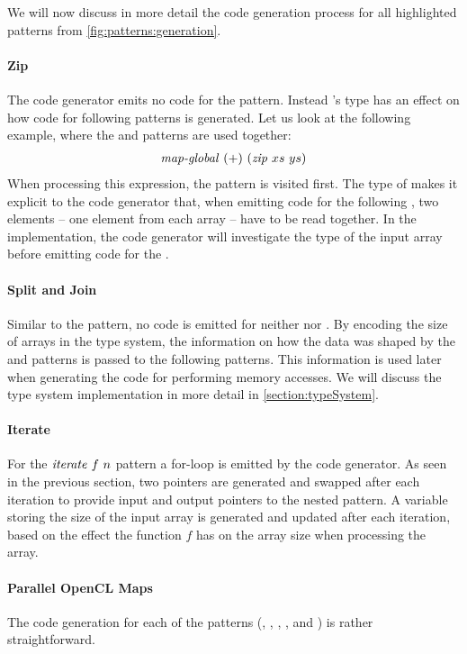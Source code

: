 We will now discuss in more detail the code generation process for all highlighted patterns from \autoref{fig:patterns:generation}.

\paragraph{Zip}
The code generator emits no \OpenCL code for the \zip pattern.
Instead \zip's type has an effect on how code for following patterns is generated.
Let us look at the following example, where the \zip and \mapGlobal patterns are used together:
\begin{align}
  \text{\textit{map-global}}\ (+)\ (\text{\textit{zip}}\ xs\ ys)
\end{align}
When processing this expression, the \zip pattern is visited first.
The type of \zip makes it explicit to the code generator that, when emitting code for the following \mapGlobal, two elements -- one element from each array -- have to be read together.
In the implementation, the code generator will investigate the type of the input array before emitting code for the \mapGlobal.

\paragraph{Split and Join}
Similar to the \zip pattern, no \OpenCL code is emitted for neither \splitN nor \join.
By encoding the size of arrays in the type system, the information on how the data was shaped by the \splitN and \join patterns is passed to the following patterns.
This information is used later when generating the \OpenCL code for performing \OpenCL memory accesses. 
We will discuss the type system implementation in more detail in \autoref{section:typeSystem}.

\paragraph{Iterate}
For the $\text{\textit{iterate}}\ f\ n$ pattern a for-loop is emitted by the code generator.
As seen in the previous section, two pointers are generated and swapped after each iteration to provide input and output pointers to the nested pattern.
A variable storing the size of the input array is generated and updated after each iteration, based on the effect the function $f$ has on the array size when processing the array.


\paragraph{Parallel OpenCL Maps}
The \OpenCL code generation for each of the \map patterns (\mapWorkgroup, \mapLocal, \mapGlobal, \mapWarp, and \mapLane) is rather straightforward.

